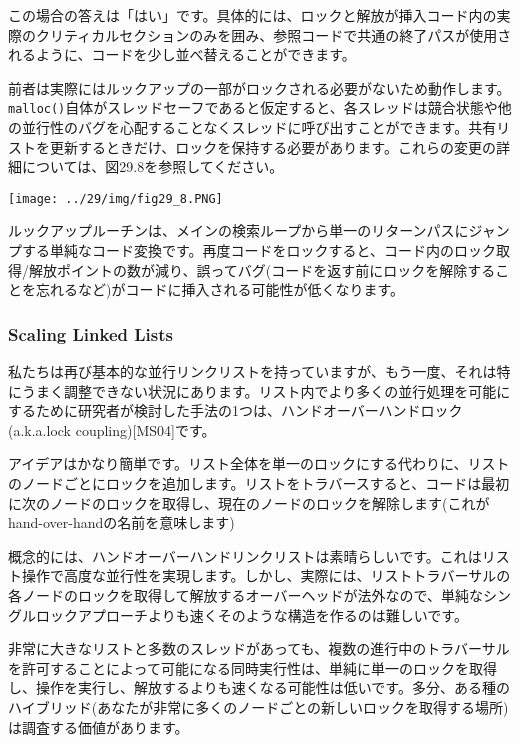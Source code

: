 この場合の答えは「はい」です。具体的には、ロックと解放が挿入コード内の実際のクリティカルセクションのみを囲み、参照コードで共通の終了パスが使用されるように、コードを少し並べ替えることができます。

前者は実際にはルックアップの一部がロックされる必要がないため動作します。\texttt{malloc()}自体がスレッドセーフであると仮定すると、各スレッドは競合状態や他の並行性のバグを心配することなくスレッドに呼び出すことができます。共有リストを更新するときだけ、ロックを保持する必要があります。これらの変更の詳細については、図29.8を参照してください。

\texttt{[image: ../29/img/fig29\_8.PNG]}

ルックアップルーチンは、メインの検索ループから単一のリターンパスにジャンプする単純なコード変換です。再度コードをロックすると、コード内のロック取得/解放ポイントの数が減り、誤ってバグ(コードを返す前にロックを解除することを忘れるなど)がコードに挿入される可能性が低くなります。

\hypertarget{scaling-linked-lists}{%
\subsubsection*{Scaling Linked Lists}\label{scaling-linked-lists}}

私たちは再び基本的な並行リンクリストを持っていますが、もう一度、それは特にうまく調整できない状況にあります。リスト内でより多くの並行処理を可能にするために研究者が検討した手法の1つは、ハンドオーバーハンドロック(a.k.a.lock
coupling){[}MS04{]}です。

アイデアはかなり簡単です。リスト全体を単一のロックにする代わりに、リストのノードごとにロックを追加します。リストをトラバースすると、コードは最初に次のノードのロックを取得し、現在のノードのロックを解除します(これがhand-over-handの名前を意味します)

概念的には、ハンドオーバーハンドリンクリストは素晴らしいです。これはリスト操作で高度な並行性を実現します。しかし、実際には、リストトラバーサルの各ノードのロックを取得して解放するオーバーヘッドが法外なので、単純なシングルロックアプローチよりも速くそのような構造を作るのは難しいです。

非常に大きなリストと多数のスレッドがあっても、複数の進行中のトラバーサルを許可することによって可能になる同時実行性は、単純に単一のロックを取得し、操作を実行し、解放するよりも速くなる可能性は低いです。多分、ある種のハイブリッド(あなたが非常に多くのノードごとの新しいロックを取得する場所)は調査する価値があります。

